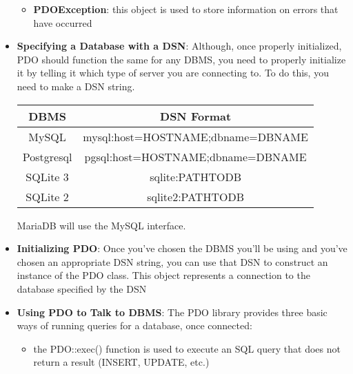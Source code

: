 \documentclass{report}
\begin{document}
\begin{itemize}
\begin{itemize}
                \item \textbf{PDOException}: this object is used to store information on errors that have occurred
            \end{itemize}
        \item \textbf{Specifying a Database with a DSN}:  Although, once properly initialized, PDO should function the same for any DBMS, you need to properly initialize it by telling it which type of server you are connecting to. To do this, you need to make a DSN string.
            \begin{center}
                \begin{tabular}{c|c}
                    DBMS &DSN Format \\
                    \hline
                    MySQL& mysql:host=HOSTNAME;dbname=DBNAME \\
                    Postgresql &pgsql:host=HOSTNAME;dbname=DBNAME \\
                    SQLite 3 &sqlite:PATHTODB \\
                    SQLite 2 &sqlite2:PATHTODB
                \end{tabular}
            \end{center}
            \bigbreak \noindent 
            MariaDB will use the MySQL interface.
        \item \textbf{Initializing PDO}: Once you've chosen the DBMS you'll be using and you've chosen an appropriate DSN string, you can use that DSN to construct an instance of the PDO class. This object represents a connection to the database specified by the DSN
            \bigbreak \noindent 
        \item \textbf{Using PDO to Talk to DBMS}: The PDO library provides three basic ways of running queries for a database, once connected:
            \begin{itemize}
                \item the PDO::exec() function is used to execute an SQL query that does not return a result (INSERT, UPDATE, etc.)

\end{itemize}
\end{itemize}
\end{document}
